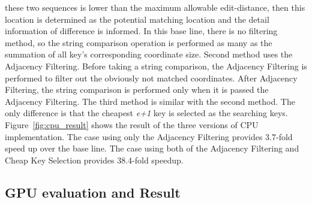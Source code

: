 these two sequences is lower than the maximum allowable edit-distance, then
this location is determined as the potential matching location and the detail
information of difference is informed. In this base line, there is no filtering
method, so the string comparison operation is performed as many as the
summation of all key’s corresponding coordinate size.  Second method uses the
Adjacency Filtering.  Before taking a string comparison, the Adjacency
Filtering is performed to filter out the obviously not matched coordinates.
After Adjacency Filtering, the string comparison is performed only when it is
passed the Adjacency Filtering. The third method is similar with the second
method. The only difference is that the cheapest \textit{e+1} key is selected
as the searching keys.  Figure~\ref{fig:cpu_result} shows the result of the
three versions of CPU implementation. The case using only the Adjacency
Filtering provides 3.7-fold speed up over the base line. The case using both of
the Adjacency Filtering and Cheap Key Selection provides 38.4-fold speedup.\\

\subsection{GPU evaluation and Result} 

